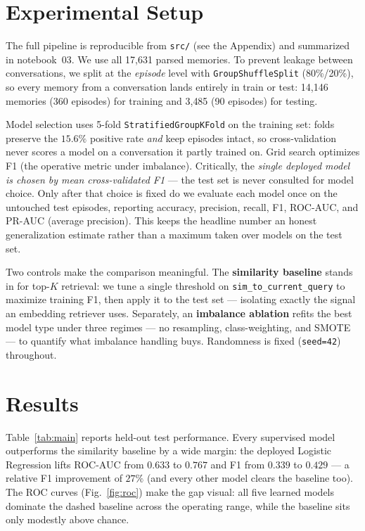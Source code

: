 \documentclass[11pt]{article}
\begin{document}
\section{Experimental Setup}\label{sec:setup}
The full pipeline is reproducible from \texttt{src/} (see the Appendix) and
summarized in notebook~03. We use all 17{,}631 parsed memories. To prevent
leakage between conversations, we split at the \emph{episode} level with
\texttt{GroupShuffleSplit} (80\%/20\%), so every memory from a conversation lands
entirely in train or test: 14{,}146 memories (360 episodes) for training and
3{,}485 (90 episodes) for testing.

Model selection uses 5-fold \texttt{StratifiedGroupKFold} on the training set:
folds preserve the $15.6\%$ positive rate \emph{and} keep episodes intact, so
cross-validation never scores a model on a conversation it partly trained on. Grid
search optimizes F1 (the operative metric under imbalance). Critically, the
\emph{single deployed model is chosen by mean cross-validated F1} --- the test set
is never consulted for model choice. Only after that choice is fixed do we evaluate
each model once on the untouched test episodes, reporting accuracy, precision,
recall, F1, ROC-AUC, and PR-AUC (average precision). This keeps the headline number
an honest generalization estimate rather than a maximum taken over models on the
test set.

Two controls make the comparison meaningful. The \textbf{similarity baseline}
stands in for top-$K$ retrieval: we tune a single threshold on
\texttt{sim\_to\_current\_query} to maximize training F1, then apply it to the test
set --- isolating exactly the signal an embedding retriever uses. Separately, an
\textbf{imbalance ablation} refits the best model type under three regimes ---
no resampling, class-weighting, and SMOTE --- to quantify what imbalance handling
buys. Randomness is fixed (\texttt{seed=42}) throughout.

\section{Results}\label{sec:results}
Table~\ref{tab:main} reports held-out test performance. Every supervised model
outperforms the similarity baseline by a wide margin: the deployed Logistic
Regression lifts ROC-AUC from $0.633$ to $0.767$ and F1 from $0.339$ to $0.429$ ---
a relative F1 improvement of $27\%$ (and every other model clears the baseline
too). The ROC curves (Fig.~\ref{fig:roc}) make the gap visual:
all five learned models dominate the dashed baseline across the operating range,
while the baseline sits only modestly above chance.
\end{document}
